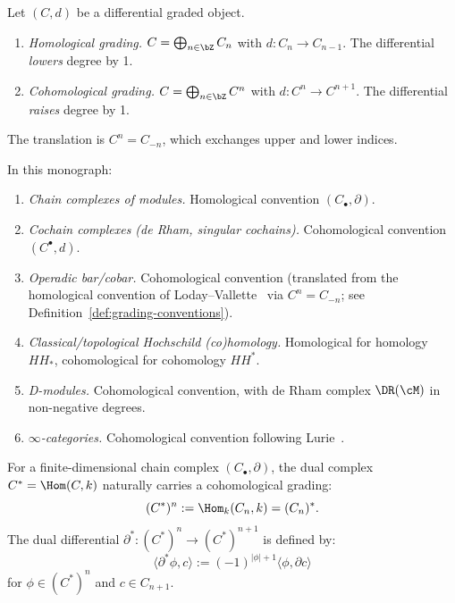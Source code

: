 \begin{definition}
\label{def:grading-conventions}
Let $(C, d)$ be a differential graded object.
\begin{enumerate}[label=(\roman*)]
\item \emph{Homological grading.} $C = \bigoplus_{n \in \bZ} C_n$ with
$d: C_n \to C_{n-1}$. The differential \emph{lowers} degree by 1.
\item \emph{Cohomological grading.} $C = \bigoplus_{n \in \bZ} C^n$ with
$d: C^n \to C^{n+1}$. The differential \emph{raises} degree by 1.
\end{enumerate}
The translation is $C^n = C_{-n}$, which exchanges upper and lower indices.
\end{definition}

\begin{convention}
\label{conv:standard-by-context}
In this monograph:
\begin{enumerate}[label=(\roman*)]
\item \emph{Chain complexes of modules.} Homological convention $(C_\bullet, \partial)$.
\item \emph{Cochain complexes (de Rham, singular cochains).}
Cohomological convention $(C^\bullet, d)$.
\item \emph{Operadic bar/cobar.} Cohomological convention (translated from the homological convention of Loday--Vallette~\cite{LV12} via $C^n = C_{-n}$; see Definition~\ref{def:grading-conventions}).
\item \emph{Classical/topological Hochschild (co)homology.} Homological for homology $HH_*$,
cohomological for cohomology $HH^*$.
\item \emph{D-modules.} Cohomological convention, with de Rham complex
$\DR(\cM)$ in non-negative degrees.
\item \emph{$\infty$-categories.} Cohomological convention following
Lurie~\cite{HTT, HA}.
\end{enumerate}
\end{convention}

\begin{proposition}
\label{prop:duality-grading}
For a finite-dimensional chain complex $(C_\bullet, \partial)$, the dual
complex $C^* = \Hom(C, k)$ naturally carries a cohomological grading:
\[
(C^*)^n := \Hom_k(C_n, k) = (C_n)^*.
\]
The dual differential $\partial^*: (C^*)^n \to (C^*)^{n+1}$ is defined by:
\[
\langle \partial^* \phi, c \rangle := (-1)^{|\phi|+1} \langle \phi, \partial c \rangle
\]
for $\phi \in (C^*)^n$ and $c \in C_{n+1}$.
\end{proposition}

